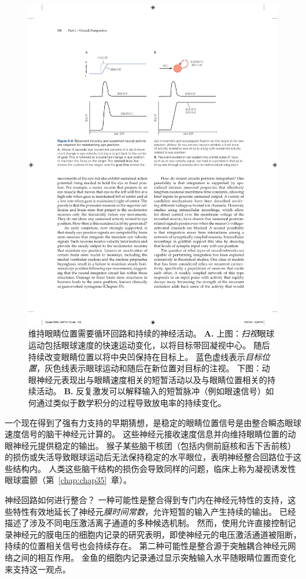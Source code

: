 \begin{figure}[htbp]
	\centering
	\includegraphics[width=0.9\linewidth]{chap05/fig_5_6}
	\caption{维持眼睛位置需要循环回路和持续的神经活动。
		\textbf{A.} 上图：\textit{扫视}眼球运动包括眼球速度的快速运动变化，以将目标带回凝视中心。
		随后持续改变眼睛位置以将中央凹保持在目标上。
		蓝色虚线表示\textit{目标位置}，灰色线表示眼球运动和随后在新位置对目标的注视。
		下图：动眼神经元表现出与眼睛速度相关的短暂活动以及与眼睛位置相关的持续活动。
		\textbf{B.} 反复激发可以解释输入的短暂脉冲（例如眼速信号）如何通过类似于数学积分的过程导致放电率的持续变化。}
	\label{fig:5_6}
\end{figure}


一个现在得到了强有力支持的早期猜想，是稳定的眼睛位置信号是由整合瞬态眼球速度信号的脑干神经元计算的。 
这些神经元接收速度信息并向维持眼睛位置的动眼神经元提供稳定的输出。 
猴子某些脑干核团（包括内侧前庭核和舌下舌前核）的损伤或失活导致眼球运动后无法保持稳定的水平眼位，表明神经整合回路位于这些结构内。 
人类这些脑干结构的损伤会导致同样的问题，临床上称为凝视诱发性眼球震颤（第~\ref{chap:chap35}~章）。


神经回路如何进行整合？
一种可能性是整合得到专门内在神经元特性的支持，这些特性有效地延长了神经元\textit{膜时间常数}，允许短暂的输入产生持续的输出。
已经描述了涉及不同电压激活离子通道的多种候选机制。 
然而，使用允许直接控制记录神经元的膜电压的细胞内记录的研究表明，即使神经元的电压激活通道被阻断，持续的位置相关信号也会持续存在。 
第二种可能性是整合源于突触耦合神经元网络之间的相互作用。 
金鱼的细胞内记录通过显示突触输入水平随眼睛位置而变化来支持这一观点。


